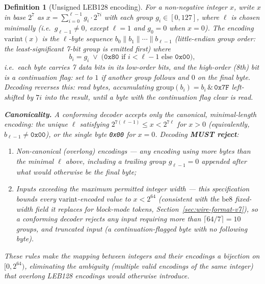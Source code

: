 \documentclass[11pt,a4paper]{article}
\newtheorem{definition}[theorem]{Definition}
\begin{document}
\begin{definition}[Unsigned LEB128 encoding]
\label{def:leb128}
For a non-negative integer $x$, write $x$ in base $2^7$ as
$x = \sum_{i=0}^{\ell-1} g_i \cdot 2^{7i}$ with each \emph{group}
$g_i \in [0, 127]$, where $\ell$ is chosen minimally (i.e.\ $g_{\ell-1} \neq 0$,
except $\ell = 1$ and $g_0 = 0$ when $x = 0$). The encoding
$\mathrm{varint}(x)$ is the $\ell$-byte sequence $b_0 \| b_1 \| \cdots \|
b_{\ell-1}$ (\emph{little-endian group order}: the least-significant
7-bit group is emitted first) where
\[
  b_i = g_i \;\lor\; \bigl(\texttt{0x80} \text{ if } i < \ell-1 \text{ else } \texttt{0x00}\bigr),
\]
i.e.\ each byte carries 7 data bits in its low-order bits, and the
high-order (8th) bit is a \emph{continuation flag}: set to $1$ if another
group follows and $0$ on the final byte. Decoding reverses this: read
bytes, accumulating $\mathrm{group}(b_i) = b_i \,\&\, \texttt{0x7F}$
left-shifted by $7i$ into the result, until a byte with the continuation
flag clear is read.

\textbf{Canonicality.} A conforming decoder accepts \emph{only} the
canonical, minimal-length encoding: the unique $\ell$ satisfying
$2^{7(\ell-1)} \leq x < 2^{7\ell}$ for $x>0$ (equivalently, $b_{\ell-1} \neq
\texttt{0x00}$), or the single byte \texttt{0x00} for $x=0$. Decoding
\textbf{MUST reject}:
\begin{enumerate}
  \item \emph{Non-canonical (overlong) encodings} --- any encoding using
        more bytes than the minimal $\ell$ above, including a trailing
        group $g_{\ell-1} = 0$ appended after what would otherwise be the
        final byte;
  \item \emph{Inputs exceeding the maximum permitted integer width} ---
        this specification bounds every $\mathrm{varint}$-encoded value to
        $x < 2^{64}$ (consistent with the $\mathrm{be8}$ fixed-width field
        it replaces for block-mode tokens, Section~\ref{sec:wire-format-v7}),
        so a conforming decoder rejects any input requiring more than
        $\lceil 64/7 \rceil = 10$ groups, and truncated input (a
        continuation-flagged byte with no following byte).
\end{enumerate}
These rules make the mapping between integers and their encodings a
bijection on $[0, 2^{64})$, eliminating the ambiguity (multiple valid
encodings of the same integer) that overlong LEB128 encodings would
otherwise introduce.
\end{definition}
\end{document}
